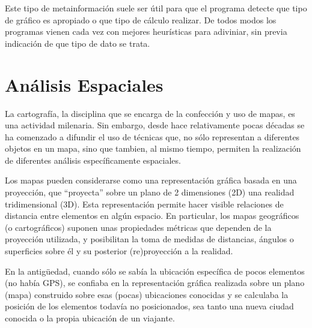 \documentclass[
  letterpaper,
  DIV=11,
  numbers=noendperiod]{scrreprt}
\begin{document}
Este tipo de metainformación suele ser útil para que el programa detecte
que tipo de gráfico es apropiado o que tipo de cálculo realizar. De
todos modos los programas vienen cada vez con mejores heurísticas para
adiviniar, sin previa indicación de que tipo de dato se trata.


\hypertarget{anuxe1lisis-espaciales}{%
\chapter{Análisis Espaciales}\label{anuxe1lisis-espaciales}}

La cartografía, la disciplina que se encarga de la confección y uso de
mapas, es una actividad milenaria. Sin embargo, desde hace relativamente
pocas décadas se ha comenzado a difundir el uso de técnicas que, no sólo
representan a diferentes objetos en un mapa, sino que tambien, al mismo
tiempo, permiten la realización de diferentes análisis específicamente
espaciales.

Los mapas pueden considerarse como una representación gráfica basada en
una proyección, que ``proyecta'' sobre un plano de 2 dimensiones (2D)
una realidad tridimensional (3D). Esta representación permite hacer
visible relaciones de distancia entre elementos en algún espacio. En
particular, los mapas geográficos (o cartográficos) suponen unas
propiedades métricas que dependen de la proyección utilizada, y
posibilitan la toma de medidas de distancias, ángulos o superficies
sobre él y su posterior (re)proyección a la realidad.

En la antigüedad, cuando sólo se sabía la ubicación específica de pocos
elementos (no había GPS), se confiaba en la representación gráfica
realizada sobre un plano (mapa) construido sobre esas (pocas)
ubicaciones conocidas y se calculaba la posición de los elementos
todavía no posicionados, sea tanto una nueva ciudad conocida o la propia
ubicación de un viajante.
\end{document}
